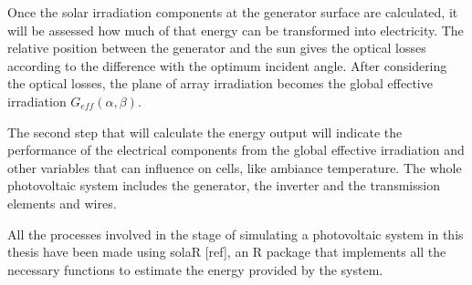 Once the solar irradiation components at the generator surface are calculated, it will be assessed how much of that energy can be transformed into electricity. The relative position between the generator and the sun gives the optical losses according to the difference with the optimum incident angle. After considering the optical losses, the plane of array irradiation becomes the global effective irradiation $G_{eff}(\alpha, \beta)$.

The second step that will calculate the energy output will indicate the performance of the electrical components from the global effective irradiation and other variables that can influence on cells, like ambiance temperature. The whole photovoltaic system includes the generator, the inverter and the transmission elements and wires.



All the processes involved in the stage of simulating a photovoltaic system in this thesis have been made using solaR [ref], an R package that implements all the necessary functions to estimate the energy provided by the system.

